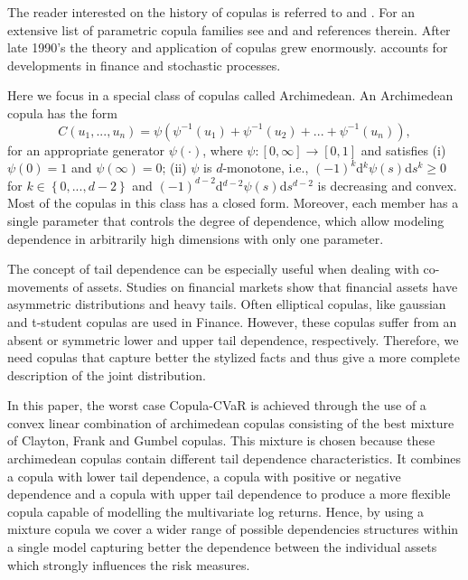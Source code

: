 \documentclass[a4paper,12pt]{report}
\begin{document}
\begin{refsection}
The reader interested on the history of copulas is referred to \citet*{%
	schweizer2011} and \citet*{nelsen06}. For an extensive list of parametric
copula families see \citet*{joe97} and \citet*{nelsen06} and references
therein. After late 1990's the theory and application of copulas grew
enormously. \citet*{cherubini04} accounts for developments in finance and
stochastic processes.

Here we focus in a special class of copulas called Archimedean. An
Archimedean copula has the form
\begin{equation}
C\left( u_{1},...,u_{n}\right) =\psi \left( \psi ^{-1}\left( u_{1}\right)
+\psi ^{-1}\left( u_{2}\right) +...+\psi ^{-1}\left( u_{n}\right) \right) ,
\end{equation}%
for an appropriate generator $\psi \left( \cdot \right) $, where $\psi :%
\left[ 0,\infty \right] \rightarrow \left[ 0,1\right] $ and satisfies (i) $%
\psi (0)=1$ and $\psi (\infty )=0$; (ii) $\psi $ is $d$-monotone, i.e., $%
(-1)^{k}$d$^{k}\psi \left( s\right) $d$s^{k}\geq 0$ for $k\in \left\{
0,...,d-2\right\} $ and $(-1)^{d-2}$d$^{d-2}\psi \left( s\right) $d$s^{d-2}$
is decreasing and convex. Most of the copulas in this class has a closed
form. Moreover, each member has a single parameter that controls the degree
of dependence, which allow modeling dependence in arbitrarily high
dimensions with only one parameter.

The concept of tail dependence can be especially useful when dealing with
co-movements of assets. Studies on financial markets show that financial
assets have asymmetric distributions and heavy tails. Often elliptical
copulas, like gaussian and t-student copulas are used in Finance. However,
these copulas suffer from an absent or symmetric lower and upper tail
dependence, respectively. Therefore, we need copulas that capture better the
stylized facts and thus give a more complete description of the joint
distribution.

In this paper, the worst case Copula-CVaR is achieved through the use of a
convex linear combination of archimedean copulas consisting of the best
mixture of Clayton, Frank and Gumbel copulas. This mixture is chosen because
these archimedean copulas contain different tail dependence characteristics.
It combines a copula with lower tail dependence, a copula with positive or
negative dependence and a copula with upper tail dependence to produce a
more flexible copula capable of modelling the multivariate log returns.
Hence, by using a mixture copula we cover a wider range of possible
dependencies structures within a single model capturing better the
dependence between the individual assets which strongly influences the risk
measures.


\end{refsection}
\end{document}
